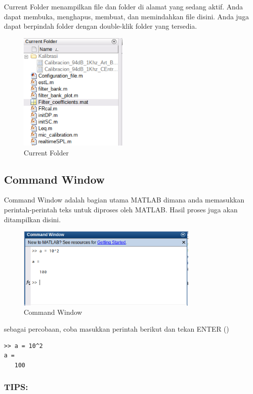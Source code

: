 \documentclass[12pt]{book}
\begin{document}
	Current Folder menampilkan file dan folder di alamat yang sedang aktif.
	Anda dapat membuka, menghapus, membuat, dan memindahkan file disini.
	Anda juga dapat berpindah folder dengan double-klik folder yang tersedia.

	\begin{figure}[!ht]
		\centering
		\includegraphics[width=150pt]{images/currentfolder}
		\caption{Current Folder}
	\end{figure}

	\subsection{Command Window}

	Command Window adalah bagian utama MATLAB dimana anda memasukkan perintah-perintah teks untuk diproses oleh MATLAB.
	Hasil proses juga akan ditampilkan disini.

	\begin{figure}[!ht]
		\centering
		\includegraphics[width=250pt]{images/commandwindow}
		\caption{Command Window}
	\end{figure}

	sebagai percobaan, coba masukkan perintah berikut dan tekan ENTER (\keys{\return})

	\begin{verbatim}
>> a = 10^2
a =
   100
	\end{verbatim}

	\subsubsection{TIPS:}
\end{document}
